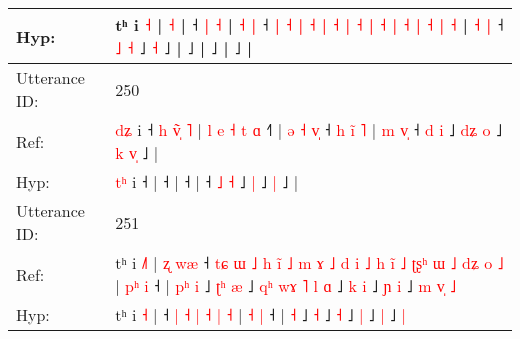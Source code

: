 \documentclass[10pt]{article}
\DeclareRobustCommand{\hl}[1]{{\textcolor{red}{#1}}}
\begin{document}
\begin{longtable}{ll}
 \\
Hyp: & tʰ i \hl{}\hl{˧} |\hl{}\hl{}\hl{}\hl{}\hl{}\hl{}\hl{}\hl{}\hl{}\hl{}\hl{}\hl{}\hl{}\hl{}\hl{}\hl{}\hl{}\hl{}\hl{}\hl{}\hl{}\hl{}\hl{}\hl{}\hl{}\hl{}\hl{}\hl{}\hl{}\hl{}\hl{}\hl{}\hl{}\hl{}\hl{}\hl{}\hl{}\hl{}\hl{}\hl{}\hl{}\hl{}\hl{}\hl{}\hl{}\hl{}\hl{}\hl{}\hl{}\hl{} \hl{˧} |\hl{}\hl{}\hl{}\hl{}\hl{} ˧\hl{}\hl{} \hl{|} \hl{˧} | \hl{}\hl{}\hl{˧} \hl{|} ˧\hl{}\hl{} \hl{}\hl{|} \hl{˧} \hl{|} \hl{˧} \hl{|} \hl{˧} \hl{|} \hl{˧} \hl{|} \hl{}\hl{˧} \hl{|} \hl{}\hl{}\hl{˧} \hl{|} \hl{˧} \hl{}\hl{|} \hl{˧} | \hl{˧} \hl{}\hl{|} ˧ \hl{}\hl{˩} \hl{˧} ˩\hl{}\hl{} \hl{˧} ˩ |\hl{}\hl{}\hl{}\hl{} ˩\hl{} |\hl{}\hl{}\hl{}\hl{}\hl{} ˩\hl{} |\hl{}\hl{}\hl{}\hl{}\hl{}\hl{}\hl{}\hl{}\hl{}\hl{} ˩ |
 \\
\midrule
Utterance ID: & 250 \\
Ref: & \hl{d}\hl{ʑ} i ˧\hl{ }\hl{h}\hl{ }\hl{v}\hl{̃}\hl{̩}\hl{ }\hl{˥} |\hl{ }\hl{l}\hl{ }\hl{e}\hl{ }\hl{˧}\hl{ }\hl{t}\hl{ }\hl{ɑ} ˧\hl{˥} |\hl{ }\hl{ə}\hl{ }\hl{˧}\hl{ }\hl{v}\hl{̩} ˧\hl{ }\hl{h}\hl{ }\hl{i}\hl{̃}\hl{ }\hl{˥} |\hl{ }\hl{m}\hl{ }\hl{v}\hl{̩} ˧ \hl{d} \hl{i} ˩\hl{ }\hl{d}\hl{ʑ} \hl{o} ˩\hl{ }\hl{k} \hl{v}\hl{̩} ˩ |
 \\
Hyp: & \hl{t}\hl{ʰ} i ˧\hl{}\hl{}\hl{}\hl{}\hl{}\hl{}\hl{}\hl{} |\hl{}\hl{}\hl{}\hl{}\hl{}\hl{}\hl{}\hl{}\hl{}\hl{} ˧\hl{} |\hl{}\hl{}\hl{}\hl{}\hl{}\hl{}\hl{} ˧\hl{}\hl{}\hl{}\hl{}\hl{}\hl{}\hl{} |\hl{}\hl{}\hl{}\hl{}\hl{} ˧ \hl{˩} \hl{˧} ˩\hl{}\hl{}\hl{} \hl{|} ˩\hl{}\hl{} \hl{}\hl{|} ˩ |
 \\
\midrule
Utterance ID: & 251 \\
Ref: & tʰ i \hl{˩}\hl{˥} |\hl{ }\hl{ʐ}\hl{ }\hl{w}\hl{æ} ˧\hl{ }\hl{t}\hl{ɕ}\hl{ }\hl{ɯ}\hl{ }\hl{˩}\hl{ }\hl{h}\hl{ }\hl{i}\hl{̃}\hl{ }\hl{˩}\hl{ }\hl{m}\hl{ }\hl{ɤ}\hl{ }\hl{˩}\hl{ }\hl{d}\hl{ }\hl{i}\hl{ }\hl{˩}\hl{ }\hl{h}\hl{ }\hl{i}\hl{̃}\hl{ }\hl{˩} \hl{ʈ}\hl{ʂ}\hl{ʰ} \hl{ɯ} \hl{˩} \hl{d}\hl{ʑ} \hl{o} \hl{˩} | \hl{p}\hl{ʰ} \hl{i} ˧ |\hl{ }\hl{p}\hl{ʰ} \hl{i} ˩\hl{ }\hl{ʈ}\hl{ʰ} \hl{æ} ˩\hl{ }\hl{q}\hl{ʰ}\hl{ }\hl{w}\hl{ɤ}\hl{ }\hl{˥}\hl{ }\hl{l} \hl{ɑ} ˩\hl{ }\hl{k} \hl{i} ˩\hl{ }\hl{ɲ} \hl{i} ˩\hl{ }\hl{m}\hl{ }\hl{v}\hl{̩} \hl{˩}
 \\
Hyp: & tʰ i \hl{}\hl{˧} |\hl{}\hl{}\hl{}\hl{}\hl{} ˧\hl{}\hl{}\hl{}\hl{}\hl{}\hl{}\hl{}\hl{}\hl{}\hl{}\hl{}\hl{}\hl{}\hl{}\hl{}\hl{}\hl{}\hl{}\hl{}\hl{}\hl{}\hl{}\hl{}\hl{}\hl{}\hl{}\hl{}\hl{}\hl{}\hl{}\hl{}\hl{}\hl{} \hl{}\hl{}\hl{|} \hl{˧} \hl{|} \hl{}\hl{˧} \hl{|} \hl{˧} | \hl{}\hl{˧} \hl{|} ˧ |\hl{}\hl{}\hl{} \hl{˧} ˩\hl{}\hl{}\hl{} \hl{˧} ˩\hl{}\hl{}\hl{}\hl{}\hl{}\hl{}\hl{}\hl{}\hl{}\hl{} \hl{˧} ˩\hl{}\hl{} \hl{|} ˩\hl{}\hl{} \hl{|} ˩\hl{}\hl{}\hl{}\hl{}\hl{} \hl{|}

\end{longtable}
\end{document}
